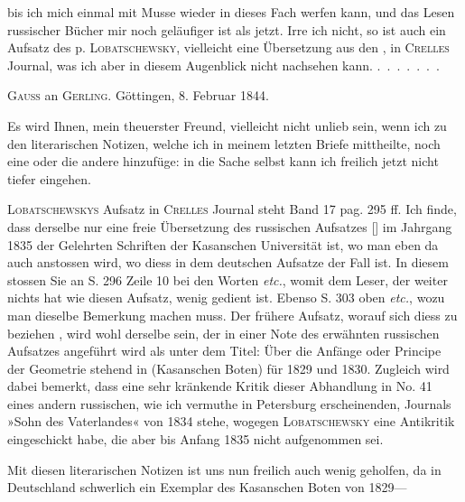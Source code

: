 %
bis ich mich einmal mit Musse wieder in dieses Fach werfen kann, und das Lesen russischer Bücher mir noch geläufiger ist als jetzt. Irre ich nicht, so ist auch ein Aufsatz des p. \textsc{Lobatschewsky}, vielleicht eine Übersetzung aus den , in \textsc{Crelles} Journal, was ich aber in diesem Augenblick nicht nachsehen kann. \mbox{.\ .\ .\ .\ .\ .\ .}

\par\bigskip{}

\begin{center}\textsc{Gauss} an \textsc{Gerling}. Göttingen, 8. Februar 1844.\end{center}

Es wird Ihnen, mein theuerster Freund, vielleicht nicht unlieb sein, wenn ich zu den literarischen Notizen, welche ich in meinem letzten Briefe mittheilte, noch eine oder die andere hinzufüge: in die Sache selbst kann ich freilich jetzt nicht tiefer eingehen.

\textsc{Lobatschewskys} Aufsatz in \textsc{Crelles} Journal steht Band 17 pag. 295 ff. Ich finde, dass derselbe nur eine freie Übersetzung des russischen Aufsatzes [] im Jahrgang 1835 der Gelehrten Schriften der Kasanschen Universität ist, wo man eben da auch anstossen wird, wo diess in dem deutschen Aufsatze der Fall ist. In diesem stossen Sie an S. 296 Zeile 10 bei den Worten  \emph{etc.}, womit dem Leser, der weiter nichts hat wie diesen Aufsatz, wenig gedient ist. Ebenso S. 303 oben  \emph{etc.}, wozu man dieselbe Bemerkung machen muss. Der frühere Aufsatz, worauf sich diess zu beziehen , wird wohl derselbe sein, der in einer Note des erwähnten russischen Aufsatzes angeführt wird als unter dem Titel: Über die Anfänge oder Principe der Geometrie stehend in  (Kasanschen Boten) für 1829 und 1830. Zugleich wird dabei bemerkt, dass eine sehr kränkende Kritik dieser Abhandlung in No. 41 eines andern russischen, wie ich vermuthe in Petersburg erscheinenden, Journals »Sohn des Vaterlandes«  von 1834 stehe, wogegen \textsc{Lobatschewsky} eine Antikritik eingeschickt habe, die aber bis Anfang 1835 nicht aufgenommen sei.

Mit diesen literarischen Notizen ist uns nun freilich auch wenig geholfen, da in Deutschland schwerlich ein Exemplar des Kasanschen Boten von 1829---%
